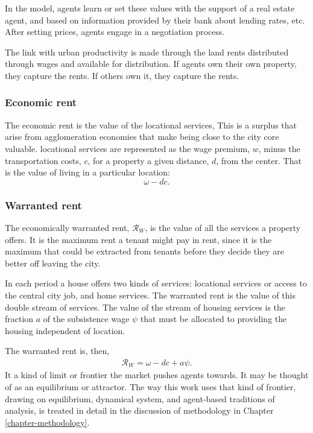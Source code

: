 In the model, agents learn or set these values with the support of a real estate agent, and based on information provided by their bank about lending rates, etc. After setting prices, agents engage in a negotiation process. 

The link with urban productivity is made through the land rents distributed through wages and available for distribution. If agents own their own property, they capture the rents. If others own it, they capture the rents.


\subsubsection{Economic rent}\label{sssec-economic-rent}
The economic rent is the value of the locational services, 
This is a surplus that arise from agglomeration economies that make being close to the city core valuable. \Gls{locational services} are represented as %
the wage premium, $w$, minus the transportation costs, $c$, for a property a given distance, $d$, from the center. That is the value of living in a particular location:
\[\omega- {dc}.\]


\subsubsection{Warranted rent}\label{sssec-waranted-rent}

The economically \gls{warranted rent}, $\mathcal{R}_W$, is the value of all  the services a property offers. %
It is the maximum rent  a tenant might pay in rent, since it is the maximum that could be extracted from tenants before they decide they are better off leaving the city.  

In each period a house offers two kinds of services: {locational services} or  access to the central city job, and {home services}.  The {warranted rent} is the value of this double stream of services.  The value of the stream of housing services is the fraction $a$ of the subsistence wage $\psi$ that must be allocated to providing the housing independent of location. 

 The warranted rent is, then, 
\begin{align}
\mathcal{R}_W=\omega- {dc} + a\psi.
\label{eqn-warranted-rent}
\end{align}
 It a kind of limit or \gls{frontier} the market pushes agents towards. It may be thought of as an \gls{equilibrium} or \gls{attractor}. The way this work uses that kind of frontier, drawing on \gls{equilibrium}, \gls{dynamical system}, and \gls{agent-based} traditions of analysis, is treated in detail in the discussion of methodology in Chapter \ref{chapter-methodology}.

